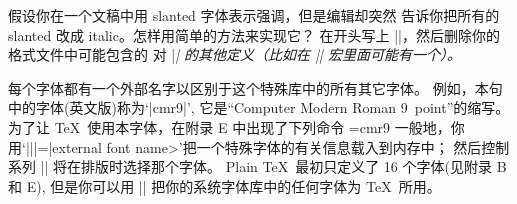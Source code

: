 \dangerexercise 假设你在一个文稿中用 slanted 字体表示强调，但是编辑却突然%
告诉你把所有的 slanted 改成 italic。怎样用简单的方法来实现它？
\answer 在开头写上 |\def\sl{\it}|，然后删除你的格式文件中可能包含的
对 |\sl| 的其他定义（比如在 |\tenpoint| 宏里面可能有一个）。

\danger 每个字体都有一个外部名字以区别于这个特殊库中的所有其它字体。%
例如，本句中的字体(英文版)称为`|cmr9|', 它是``{Computer
Modern} Roman 9~point''的缩写。%
为了让 \TeX\ 使用本字体，在附录 E 中出现了下列命令
\begintt
\font\ninerm=cmr9
\endtt
一般地，你用`|\font||\cs=|\<external
font name>'把一个特殊字体的有关信息载入到内存中；
然后控制系列 |\cs| 将在排版时选择那个字体。%
Plain \TeX\ 最初只定义了 16 个字体(见附录 B 和 E),
但是你可以用 |\font| 把你的系统字体库中的任何字体为 \TeX\ 所用。


